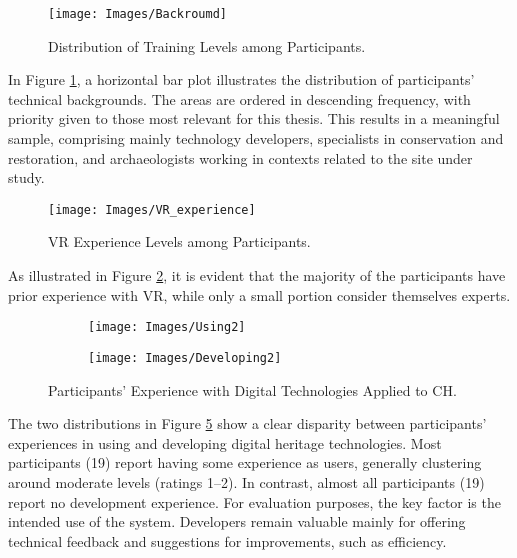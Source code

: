 \begin{figure}[h!]
    \centering
    \texttt{[image: Images/Backroumd]}
    \caption{Distribution of Training Levels among Participants.} 
    \label{fig:background}
\end{figure}

In Figure \ref{fig:background}, a horizontal bar plot illustrates the distribution of participants’ technical backgrounds. 
The areas are ordered in descending frequency, with priority given to those most relevant for this thesis. 
This results in a meaningful sample, comprising mainly technology developers, specialists in conservation and restoration, and archaeologists working in contexts related to the site under study.

\begin{figure}[h!]
    \centering
    \texttt{[image: Images/VR\_experience]}
    \caption{\gls{VR} Experience Levels among Participants.} 
    \label{fig:VR_experience}
\end{figure}

As illustrated in Figure \ref{fig:VR_experience}, it is evident that the majority of the participants have prior experience with \gls{VR}, while only a small portion consider themselves experts.

\begin{figure}[h!]
  \centering
  \begin{subfigure}[b]{0.47\textwidth}
      \centering
      \texttt{[image: Images/Using2]}
      \label{fig:Using}
  \end{subfigure}
  \hfill
  \begin{subfigure}[b]{0.47\textwidth}
      \centering
      \texttt{[image: Images/Developing2]}
      \label{fig:Developing}
  \end{subfigure}
     \caption{Participants’ Experience with Digital Technologies Applied to \gls{CH}.}
     \label{fig:hertiage_techs}
\end{figure}
\FloatBarrier
The two distributions in Figure \ref{fig:hertiage_techs} show a clear disparity between participants' experiences in using and developing digital heritage technologies. Most participants (19) report having some experience as users, generally clustering around moderate levels (ratings 1–2). 
In contrast, almost all participants (19) report no development experience.
For evaluation purposes, the key factor is the intended use of the system. Developers remain valuable mainly for offering technical feedback and suggestions for improvements, such as efficiency.


